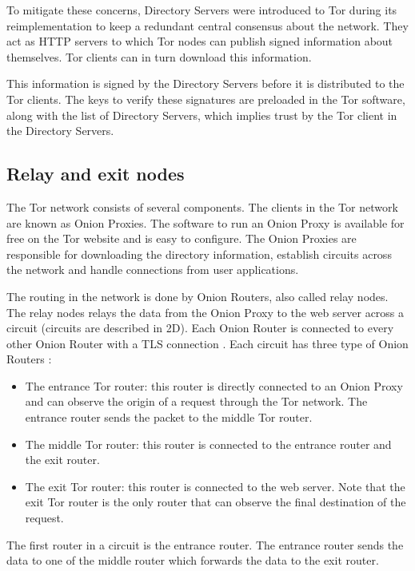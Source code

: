 \documentclass[journal]{IEEEtran}
\begin{document}
		To mitigate these concerns, Directory Servers were introduced to Tor during its reimplementation to keep a redundant central consensus about the network. They act as HTTP servers to which Tor nodes can publish signed information about themselves. Tor clients can in turn download this information.
					
		This information is signed by the Directory Servers before it is distributed to the Tor clients. The keys to verify these signatures are preloaded in the Tor software, along with the list of Directory Servers, which implies trust by the Tor client in the Directory Servers.

	\subsection{Relay and exit nodes}
		The Tor network consists of several components. The clients in the Tor network are known as Onion Proxies. The software to run an Onion Proxy is available for free on the Tor website \cite{torprojectwebsite} and is easy to configure. The Onion Proxies are responsible for downloading the directory information, establish circuits across the network and handle connections from user applications.
		
		The routing in the network is done by Onion Routers, also called relay nodes. The relay nodes relays the data from the Onion Proxy to the web server across a circuit (circuits are described in 2D). Each Onion Router is connected to every other Onion Router with a TLS connection \cite{tlsprotocol}. Each circuit has three type of Onion Routers \cite{mccoy2008shining}:
		\begin{itemize}
			\item{The entrance Tor router:} this router is directly connected to an Onion Proxy and can observe the origin of a request through the Tor network. The entrance router sends the packet to the middle Tor router.
			\item{The middle Tor router:} this router is connected to the entrance router and the exit router.
			\item{The exit Tor router:} this router is connected to the web server. Note that the exit Tor router is the only router that can observe the final destination of the request.
		\end{itemize}
		
		The first router in a circuit is the entrance router. The entrance router sends the data to one of the middle router which forwards the data to the exit router.
			
\end{document}
